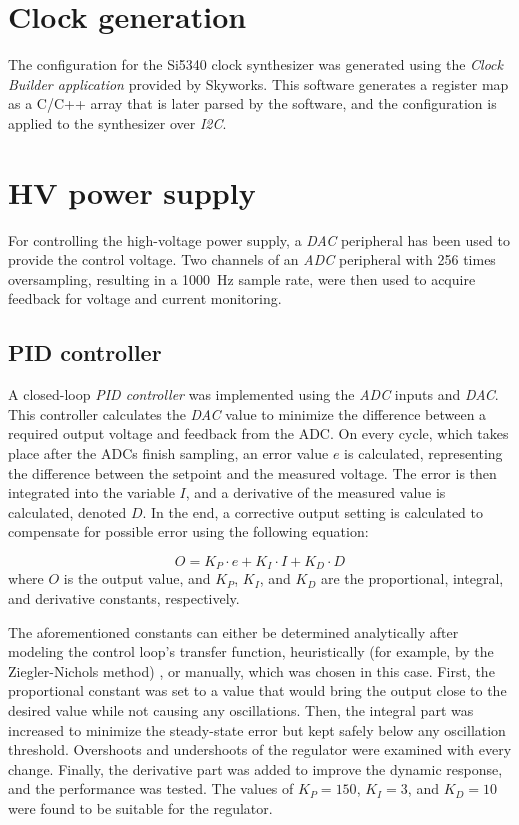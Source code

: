 \section{Clock generation}
The configuration for the Si5340 clock synthesizer was generated using the \emph{Clock Builder application} provided by Skyworks. This software generates a register map as a C/C++ array that is later parsed by the software, and the configuration is applied to the synthesizer over \emph{I2C}.

\section{HV power supply}
For controlling the high-voltage power supply, a \emph{DAC} peripheral has been used to provide the control voltage. Two channels of an \emph{ADC} peripheral with 256 times oversampling, resulting in a \SI{1000}{\hertz} sample rate, were then used to acquire feedback for voltage and current monitoring. 

\subsection{PID controller}
A closed-loop \emph{PID controller} was implemented using the \emph{ADC} inputs and \emph{DAC}. This controller calculates the \emph{DAC} value to minimize the difference between a required output voltage and feedback from the ADC. On every cycle, which takes place after the ADCs finish sampling, an error value $e$ is calculated, representing the difference between the setpoint and the measured voltage. The error is then integrated into the variable $I$, and a derivative of the measured value is calculated, denoted $D$. In the end, a corrective output setting is calculated to compensate for possible error using the following equation: \cite{ogata2010modern}

\begin{equation}
    O = K_P \cdot e + K_I \cdot I + K_D \cdot D
\end{equation}
where $O$ is the output value, and $K_P$, $K_I$, and $K_D$ are the proportional, integral, and derivative constants, respectively.

The aforementioned constants can either be determined analytically after modeling the control loop's transfer function, heuristically (for example, by the Ziegler-Nichols method) \cite{ogata2010modern}, or manually, which was chosen in this case. First, the proportional constant was set to a value that would bring the output close to the desired value while not causing any oscillations. Then, the integral part was increased to minimize the steady-state error but kept safely below any oscillation threshold. Overshoots and undershoots of the regulator were examined with every change. Finally, the derivative part was added to improve the dynamic response, and the performance was tested. The values of $K_P = 150$, $K_I = 3$, and $K_D = 10$ were found to be suitable for the regulator.
